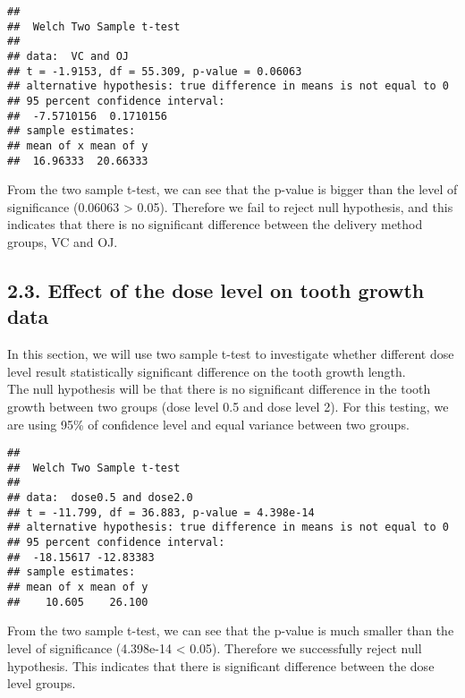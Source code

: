 \documentclass[]{article}
\newenvironment{Shaded}{\begin{snugshade}}{\end{snugshade}}
\newcommand{\KeywordTok}[1]{\textcolor[rgb]{0.13,0.29,0.53}{\textbf{#1}}}
\newcommand{\DataTypeTok}[1]{\textcolor[rgb]{0.13,0.29,0.53}{#1}}
\newcommand{\DecValTok}[1]{\textcolor[rgb]{0.00,0.00,0.81}{#1}}
\newcommand{\FloatTok}[1]{\textcolor[rgb]{0.00,0.00,0.81}{#1}}
\newcommand{\StringTok}[1]{\textcolor[rgb]{0.31,0.60,0.02}{#1}}
\newcommand{\CommentTok}[1]{\textcolor[rgb]{0.56,0.35,0.01}{\textit{#1}}}
\newcommand{\OtherTok}[1]{\textcolor[rgb]{0.56,0.35,0.01}{#1}}
\newcommand{\OperatorTok}[1]{\textcolor[rgb]{0.81,0.36,0.00}{\textbf{#1}}}
\newcommand{\NormalTok}[1]{#1}
\begin{document}
\begin{verbatim}
## 
##  Welch Two Sample t-test
## 
## data:  VC and OJ
## t = -1.9153, df = 55.309, p-value = 0.06063
## alternative hypothesis: true difference in means is not equal to 0
## 95 percent confidence interval:
##  -7.5710156  0.1710156
## sample estimates:
## mean of x mean of y 
##  16.96333  20.66333
\end{verbatim}

From the two sample t-test, we can see that the p-value is bigger than
the level of significance (0.06063 \textgreater{} 0.05). Therefore we
fail to reject null hypothesis, and this indicates that there is no
significant difference between the delivery method groups, VC and OJ.

\subsection{2.3. Effect of the dose level on tooth growth
data}\label{effect-of-the-dose-level-on-tooth-growth-data}

In this section, we will use two sample t-test to investigate whether
different dose level result statistically significant difference on the
tooth growth length.\\
The null hypothesis will be that there is no significant difference in
the tooth growth between two groups (dose level 0.5 and dose level 2).
For this testing, we are using 95\% of confidence level and equal
variance between two groups.

\begin{Shaded}
\end{Shaded}

\begin{verbatim}
## 
##  Welch Two Sample t-test
## 
## data:  dose0.5 and dose2.0
## t = -11.799, df = 36.883, p-value = 4.398e-14
## alternative hypothesis: true difference in means is not equal to 0
## 95 percent confidence interval:
##  -18.15617 -12.83383
## sample estimates:
## mean of x mean of y 
##    10.605    26.100
\end{verbatim}

From the two sample t-test, we can see that the p-value is much smaller
than the level of significance (4.398e-14 \textless{} 0.05). Therefore
we successfully reject null hypothesis. This indicates that there is
significant difference between the dose level groups.
\end{document}
